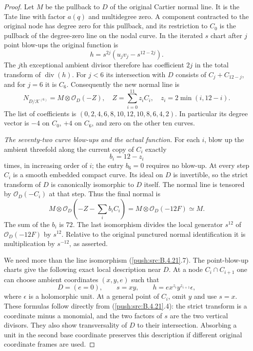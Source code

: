 \begin{proof}
Let $M$ be the pullback to $D$ of the original Cartier normal
line.  It is the Tate line with factor $a(q)$ and multidegree
zero.  A component contracted to the original node has degree
zero for this pullback, and its restriction to $C_0$ is the
pullback of the degree-zero line on the nodal curve.
In the iterated $s$ chart after $j$ point blow-ups the original
function is
\[
 h=s^{2j}(u_jv_j-s^{12-2j}).
\]
The $j$th exceptional ambient divisor therefore has coefficient
$2j$ in the total transform of $\operatorname{div}(h)$.
For $j<6$ its intersection with $D$ consists of
$C_j+C_{12-j}$, and for $j=6$ it is $C_6$.
Consequently the new normal line is
\[
 N_{D/\mathcal K^{(6)}}=M\otimes\mathcal O_D(-Z),
 \quad Z=\sum_{i=0}^{11}z_iC_i,
 \quad z_i=2\min(i,12-i).
 \tag{B.4.21.6}
\]
The list of coefficients is
$(0,2,4,6,8,10,12,10,8,6,4,2)$.
In particular its degree vector is $-4$ on $C_0$, $+4$ on
$C_6$, and zero on the other ten curves.

\emph{The seventy-two curve blow-ups and the actual function.}
For each $i$, blow up the ambient threefold along the current
copy of $C_i$ exactly
\[
 b_i=12-z_i
\]
times, in increasing order of $i$; the entry $b_6=0$ requires
no blow-up.  At every step $C_i$ is a smooth embedded compact
curve.  Its ideal on $D$ is invertible, so the strict transform
of $D$ is canonically isomorphic to $D$ itself.  The normal
line is tensored by $\mathcal O_D(-C_i)$ at that step.
Thus the final normal is
\[
 M\otimes\mathcal O_D(-Z-\textstyle\sum_i b_iC_i)
   =M\otimes\mathcal O_D(-12F)\simeq M.
 \tag{B.4.21.7}
\]
The sum of the $b_i$ is $72$.
The last isomorphism divides the local generator $s^{12}$
of $\mathcal O_D(-12F)$ by $s^{12}$.  Relative to the
original punctured normal identification it is multiplication
by $s^{-12}$, as asserted.

We need more than the line isomorphism (\ref{push:src:B.4.21}.7).
The point-blow-up charts give the following exact local
description near $D$.  At a node $C_i\cap C_{i+1}$ one can
choose ambient coordinates $(x,y,e)$ such that
\[
 D=(e=0),\qquad s=xy,\qquad
 h=e x^{z_i}y^{z_{i+1}}\epsilon,
 \tag{B.4.21.8}
\]
where $\epsilon$ is a holomorphic unit.  At a general point
of $C_i$, omit $y$ and use $s=x$.  These formulas follow
directly from (\ref{push:src:B.4.21}.4): the strict transform is a coordinate
minus a monomial, and the two factors of $s$ are the two
vertical divisors.  They also show transversality of $D$ to
their intersection.  Absorbing a unit in the second base
coordinate preserves this description if different original
coordinate frames are used.


\end{proof}
